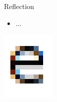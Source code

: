 \documentclass{lug}
\newcommand{\splitslide}[4]{
    \noindent
    \begin{minipage}{#1 \textwidth - #2 }
        #3
    \end{minipage}%
    \hspace{ \dimexpr #2 * 2 \relax }%
    \begin{minipage}{\textwidth - #1 \textwidth - #2 }
        #4
    \end{minipage}
}
\begin{document}
\begin{frame}{Reflection}
    \splitslide{0.65}{.7em}{
        \small
        \begin{itemize}
            \item ...
        \end{itemize}
    }{
        \includegraphics[width=\textwidth]{graphics/subpixel_e}
    }
\end{frame}
\end{document}
